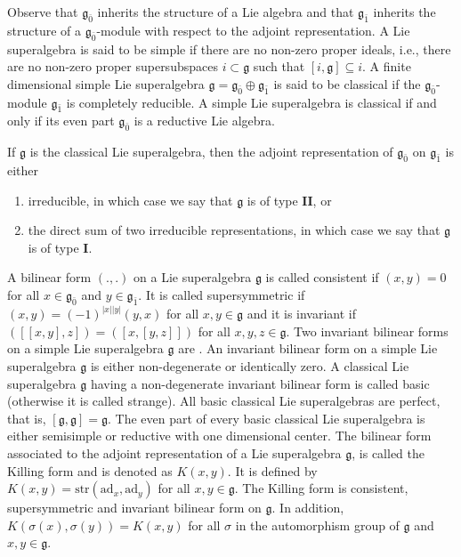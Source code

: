 \documentclass[11pt]{amsart}
\theoremstyle{plain}
\theoremstyle{definition}
\newtheorem{ex}[thm]{Example}
\newcommand{\g}{\mathfrak{g}}
\begin{document}
Observe that ${\g_{\bar 0}}$ inherits the structure of a Lie algebra and that ${\g_{\bar 1}}$ inherits the structure of a ${\g_{\bar 0}}$-module with respect to the adjoint representation. A Lie superalgebra is said to be simple if there are no non-zero proper ideals, i.e., there are no non-zero proper supersubspaces $i\subset \g$ such that $[i,\g]\subseteq i$. A finite dimensional simple Lie superalgebra ${\g}={\g_{\bar 0}}\oplus {\g_{\bar 1}}$ is said to be classical if the ${\g_{\bar 0}}$-module ${\g_{\bar 1}}$ is completely reducible. A simple Lie superalgebra is classical if and only if its even part ${\g_{\bar 0}}$ is a reductive Lie algebra. 


 If ${\g}$ is the classical Lie superalgebra, then the adjoint representation of ${\g_{\bar 0}}$ on ${\g_{\bar 1}}$ is either
\begin{enumerate}[label=(\alph*)]
    \item irreducible, in which case we say that ${\g}$ is of type $\textbf{II}$, or
    \item the direct sum of two irreducible representations, in which case we say that ${\g}$ is of type $\textbf{I}.$
\end{enumerate}
A bilinear form $(., .)$ on a Lie superalgebra $\g$ is called consistent if $(x, y)=0$ for all $x\in \g_{\bar{0}}$ and $y \in \g_{\bar{1}}.$ It is called supersymmetric if $(x, y)=(-1)^{|x||y|} (y, x)$ for all $x, y \in \g $ and it is invariant if $([[x, y], z])=([x, [y, z]])$ for all $x, y, z \in \g.$ Two invariant bilinear forms on a simple Lie superalgebra $\g$ are  \cite{Mus12,Frappat2000}. An invariant bilinear form on a simple Lie superalgebra $\g$ is either non-degenerate or identically zero.
A classical Lie superalgebra ${\g}$ having a non-degenerate invariant bilinear form is called basic (otherwise it is called strange). All basic classical Lie superalgebras are perfect, that is, $[\g,\g]=\g$. The even part of every basic classical Lie superalgebra is either semisimple or reductive with one dimensional center. The bilinear form associated to the adjoint representation of a Lie superalgebra $\g$, is called the Killing form and is denoted as $K(x, y)$. It is defined by $K(x, y)= \mbox{str}(\mathrm{ad}_x, \mathrm{ad}_y)$ for all $x, y \in \g$. The Killing form is consistent, supersymmetric and invariant bilinear form on $\g$. In addition, $K(\sigma(x), \sigma(y))=K(x, y)$ for all $\sigma $ in the automorphism group of $\g$ and $x, y \in \g.$
\end{document}
